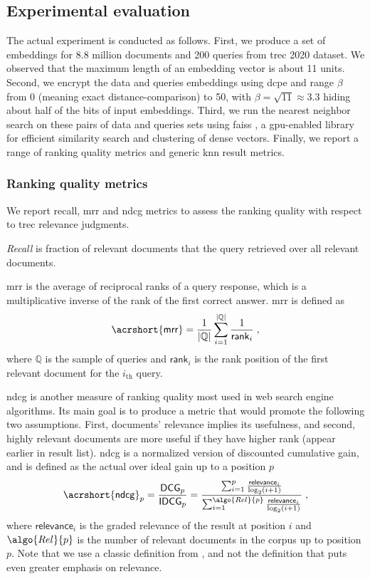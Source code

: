 		\subsection{Experimental evaluation}

			The actual experiment is conducted as follows.
			First, we produce a set of embeddings for 8.8 million documents and 200 queries from \acrshort{trec} 2020 dataset.
			We observed that the maximum length of an embedding vector is about 11 units.
			Second, we encrypt the data and queries embeddings using \acrshort{dcpe} and range $\beta$ from 0 (meaning exact distance-comparison) to 50, with $\beta = \sqrt{11} \approx 3.3$ hiding about half of the bits of input embeddings.
			Third, we run the nearest neighbor search on these pairs of data and queries sets using \acrshort{faiss} \cite{faiss}, a \acrshort{gpu}-enabled library for efficient similarity search and clustering of dense vectors.
			Finally, we report a range of ranking quality metrics and generic \acrshort{knn} result metrics.

			\subsubsection{Ranking quality metrics}

				We report recall, \acrfull{mrr} \cite{mrr} and \acrfull{ndcg} \cite{dcg} metrics to assess the ranking quality with respect to \acrshort{trec} relevance judgments.

				\emph{Recall} is fraction of relevant documents that the query retrieved over all relevant documents.

				\acrfull{mrr} is the average of reciprocal ranks of a query response, which is a multiplicative inverse of the rank of the first correct answer.
				\acrshort{mrr} is defined as
				\[
					\mathsf{\acrshort{mrr}} = \frac{1}{| \mathbb{Q} |} \sum_{i = 1}^{| \mathbb{Q} |} \frac{1}{\mathsf{rank}_i} \; ,
				\]
				where $\mathbb{Q}$ is the sample of queries and $\mathsf{rank}_i$ is the rank position of the first relevant document for the $i_\text{th}$ query.

				\acrfull{ndcg} is another measure of ranking quality most used in web search engine algorithms.
				Its main goal is to produce a metric that would promote the following two assumptions.
				First, documents' relevance implies its usefulness, and second, highly relevant documents are more useful if they have higher rank (appear earlier in result list).
				\acrshort{ndcg} is a normalized version of discounted cumulative gain, and is defined as the actual over ideal gain up to a position $p$
				\[
					\mathsf{\acrshort{ndcg}}_p = \frac{\mathsf{DCG}_p}{\mathsf{IDCG}_p} = \frac{ \sum_{i=1}^p \frac{ \mathsf{relevance}_i }{ \log_2 (i + 1) } }{ \sum_{i=1}^{ \algo{Rel}{p} } \frac{ \mathsf{relevance}_i }{ \log_2 (i + 1) } } \; ,
				\]
				where $\mathsf{relevance}_i$ is the graded relevance of the result at position $i$ and $\algo{Rel}{p}$ is the number of relevant documents in the corpus up to position $p$.
				Note that we use a classic definition from \cite{dcg}, and not the \cite{dcg-updated} definition that puts even greater emphasis on relevance.

